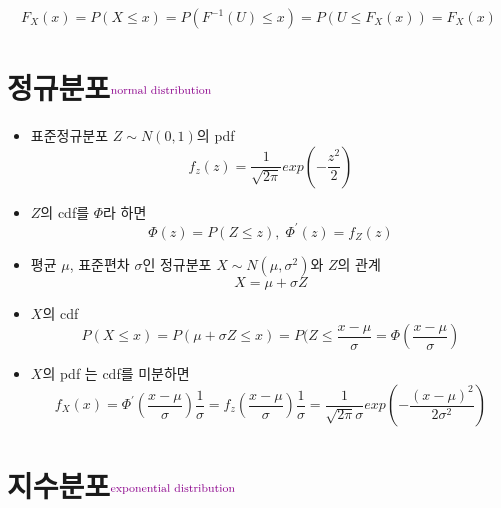 \documentclass{oblivoir}
\newcommand{\DC}[1]{\textcolor{DarkMagenta}{#1}}%
\newcommand{\UP}[1]{$^{\mbox{\DC{\footnotesize #1}}}$}
\begin{document}
$$
F_X(x) = P(X \leq x) = P(F^{-1}(U) \leq x) = P(U \leq F_X(x)) = F_X(x)
$$

\section{정규분포\UP{normal distribution}}
\begin{itemize}
\item 표준정규분포 $Z \sim N(0,1)$의 pdf
$$
f_z(z) = \frac{1}{\sqrt{2\pi}} exp \left( -\frac{z^2}{2} \right)
$$
\item $Z$의 cdf를 $\Phi$라 하면
$$
\Phi (z) = P(Z \leq z),\; \Phi^{\prime}(z) = f_Z(z)
$$
\item 평균 $\mu$, 표준편차 $\sigma$인 정규분포 $X \sim N(\mu, \sigma^2)$와 $Z$의 관계
$$
X = \mu + \sigma Z
$$
\item $X$의 cdf
$$
P(X \leq x) = P(\mu + \sigma Z \leq x) = P( Z \leq \frac{x - \mu}{\sigma} = \Phi \left(\frac{x - \mu}{\sigma} \right)
$$
\item $X$의 pdf 는 cdf를 미분하면
$$
f_X(x) = \Phi^{\prime} \left(\frac{x - \mu}{\sigma} \right) \frac{1}{\sigma} = f_z \left(\frac{x-\mu}{\sigma} \right) \frac{1}{\sigma}
= \frac{1}{\sqrt{2\pi}\sigma} exp \left(- \frac{(x - \mu)^2}{2\sigma^2} \right)
$$
\end{itemize}

\section{지수분포\UP{exponential distribution}}
\end{document}
